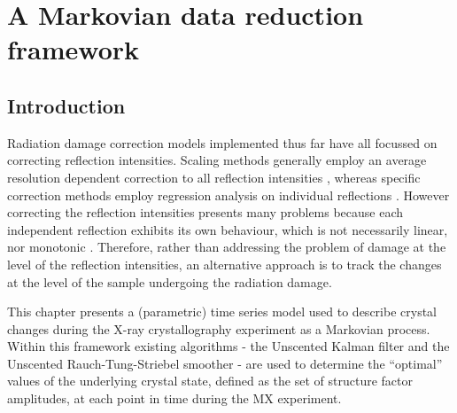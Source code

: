 \chapter{A Markovian data reduction framework}
\label{chap:A Markovian data reduction framework}

\section{Introduction}
\label{sec:Introduction - Data Reduction}
Radiation damage correction models implemented thus far have all focussed on correcting reflection intensities.
Scaling methods generally employ an average resolution dependent correction to all reflection intensities \cite{evans2005,evans2013,kabsch2010integration}, whereas specific correction methods employ regression analysis on individual reflections \cite{diederichs2003,diederichs2006}.
However correcting the reflection intensities presents many problems because each independent reflection exhibits its own behaviour, which is not necessarily linear, nor monotonic \cite{abrahams1987anisotropy}.
Therefore, rather than addressing the problem of damage at the level of the reflection intensities, an alternative approach is to track the changes at the level of the sample undergoing the radiation damage.

This chapter presents a (parametric) time series model used to describe crystal changes during the X-ray crystallography experiment as a Markovian process. Within this framework existing algorithms - the Unscented Kalman filter and the Unscented Rauch-Tung-Striebel smoother - are used to determine the ``optimal'' values of the underlying crystal state, defined as the set of structure factor amplitudes, at each point in time during the MX experiment.

